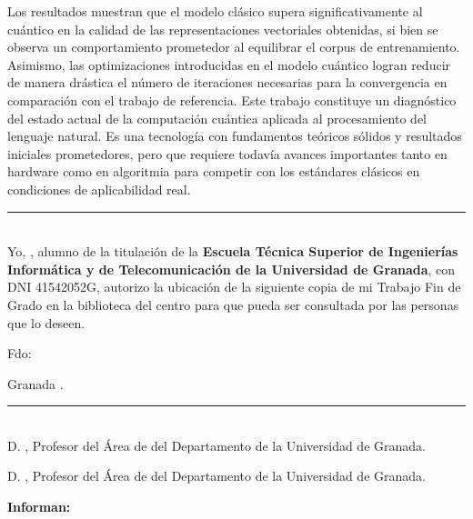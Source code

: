 Los resultados muestran que el modelo clásico supera significativamente al cuántico en la calidad de las representaciones vectoriales obtenidas, si bien se observa un comportamiento prometedor al equilibrar el corpus de entrenamiento. Asimismo, las optimizaciones introducidas en el modelo cuántico logran reducir de manera drástica el número de iteraciones necesarias para la convergencia en comparación con el trabajo de referencia. Este trabajo constituye un diagnóstico del estado actual de la computación cuántica aplicada al procesamiento del lenguaje natural. Es una tecnología con fundamentos teóricos sólidos y resultados iniciales prometedores, pero que requiere todavía avances importantes tanto en hardware como en algoritmia para competir con los estándares clásicos en condiciones de aplicabilidad real.

\noindent\rule[-1ex]{\textwidth}{2pt}\\[4.5ex]

Yo, \textbf{\myName}, alumno de la titulación \myDegree de la \textbf{Escuela Técnica Superior
  de Ingenierías Informática y de Telecomunicación de la Universidad de Granada}, con DNI 41542052G, autorizo la
ubicación de la siguiente copia de mi Trabajo Fin de Grado en la biblioteca del centro para que pueda ser
consultada por las personas que lo deseen.

\vspace{6cm}

\noindent Fdo: \myName

\vspace{2cm}

\begin{flushright}
  Granada \myTime.
\end{flushright}

\noindent\rule[-1ex]{\textwidth}{2pt}\\[4.5ex]

D. \textbf{\myProf}, Profesor del Área de \myDepartment del Departamento \myDepartment de la Universidad de Granada.

\vspace{0.5cm}

D. \textbf{\myOtherProf}, Profesor del Área de \myDepartment del Departamento \myDepartment de la Universidad de Granada.

\vspace{0.5cm}

\textbf{Informan:}

\vspace{0.5cm}

